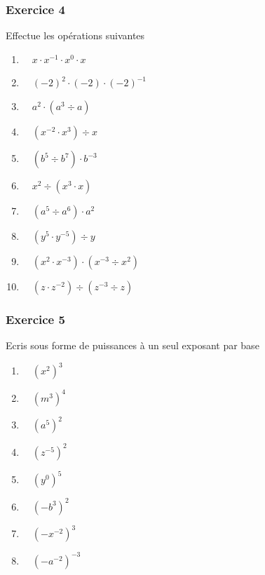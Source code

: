 \documentclass[
  12pt,
]{book}
\providecommand{\tightlist}{%
  \setlength{\itemsep}{0pt}\setlength{\parskip}{0pt}}
\begin{document}
\hypertarget{exercice-4}{%
\subsubsection*{Exercice 4}\label{exercice-4}}

Effectue les opérations suivantes

\begin{enumerate}
\def\labelenumi{\arabic{enumi}.}
\tightlist
\item
  \(\quad x\cdot x^{-1}\cdot x^0\cdot x\)
\item
  \(\quad (-2)^2\cdot (-2)\cdot(-2)^{-1}\)
\item
  \(\quad a^2\cdot(a^3\div a)\)
\item
  \(\quad (x^{-2}\cdot x^3)\div x\)
\item
  \(\quad (b^5\div b^7)\cdot b^{-3}\)
\item
  \(\quad x^2\div(x^3\cdot x)\)
\item
  \(\quad (a^5\div a^6)\cdot a^2\)
\item
  \(\quad (y^5\cdot y^{-5})\div y\)
\item
  \(\quad (x^2\cdot x^{-3})\cdot(x^{-3}\div x^2)\)
\item
  \(\quad (z\cdot z^{-2})\div (z^{-3}\div z)\)
\end{enumerate}

\hypertarget{exercice-5}{%
\subsubsection*{Exercice 5}\label{exercice-5}}

Ecris sous forme de puissances à un seul exposant par base

\begin{enumerate}
\def\labelenumi{\arabic{enumi}.}
\tightlist
\item
  \(\quad (x^2)^3\)
\item
  \(\quad (m^3)^4\)
\item
  \(\quad (a^5)^2\)
\item
  \(\quad (z^{-5})^2\)
\item
  \(\quad (y^0)^5\)
\item
  \(\quad (-b^3)^2\)
\item
  \(\quad (-x^{-2})^3\)
\item
  \(\quad (-a^{-2})^{-3}\)
\end{enumerate}
\end{document}
